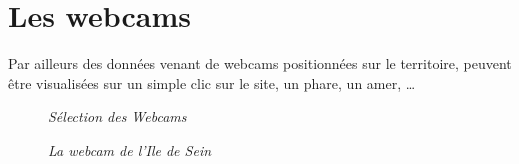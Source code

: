 \section{Les webcams}
Par ailleurs des données venant de webcams positionnées sur le territoire, peuvent être visualisées sur un simple clic
sur le site, un phare, un amer, \ldots
\begin{center}
\begin{figure}[ht]
\caption{\label{equiProj}\textit{Sélection des Webcams}}
\end{figure}
\end{center}
\begin{center}
\begin{figure}[ht]
\caption{\label{equiProj}\textit{La webcam de l'Ile de Sein}}
\end{figure}
\end{center}
